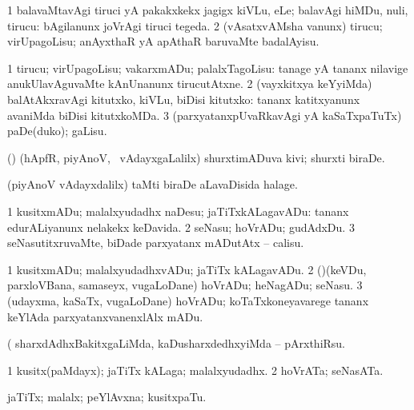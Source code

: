\bentry
{} 
\gl{\sakirx}
\expl{}
\bmng
\bnum
\num{1} balavaMtavAgi tiruci yA pakakxkekx jagigx kiVLu, eLe; balavAgi hiMDu, nuli, tirucu:  bAgilanunx joVrAgi tiruci tegeda. 
\num{2} (vAsatxvAMsha \mo vanunx) tirucu; virUpagoLisu; anAyxthaR yA apAthaR baruvaMte badalAyisu. 
\enum
\emng
\eentry

\bentry
{} 
\gl{\sakirx}
\expl{}
\bmng
\bnum
\num{1} tirucu; virUpagoLisu; vakarxmADu; palalxTagoLisu:  tanage yA tananx nilavige anukUlavAguvaMte kAnUnanunx tirucutAtxne. 
\num{2} (vayxkitxya keYyiMda) balAtAkxravAgi kitutxko, kiVLu, biDisi kitutxko:  tananx katitxyanunx avaniMda biDisi kitutxkoMDa. 
\num{3} (parxyatanxpUvaRkavAgi yA kaSaTxpaTuTx) paDe(duko); gaLisu. 
\enum
\emng
\eentry

\bentry
{} 
\gl{\nA}
\expl{}
\bmng
(\pArxparx) (hApfR, piyAnoV, \mo\ vAdayxgaLalilx) shurxtimADuva kivi; shurxti biraDe. 
\emng
\eentry

\bentry
{} 
\gl{\nA}
\expl{}
\bmng
(piyAnoV vAdayxdalilx) taMti biraDe aLavaDisida halage. 
\emng
\eentry

\bentry 
{} 
\gl{\sakirx}
\expl{}
\bmng
\bnum
\num{1} kusitxmADu; malalxyudadhx naDesu; jaTiTxkALagavADu:  tananx edurALiyanunx nelakekx keDavida. 
\num{2} seNasu; hoVrADu; gudAdxDu. 
\num{3} seNasutitxruvaMte, biDade parxyatanx mADutAtx -- calisu. 
\enum
\emng

\noindent
\gl{\akirx}
\expl{}
\bmng
\bnum
\num{1} kusitxmADu; malalxyudadhxvADu; jaTiTx kALagavADu. 
\num{2} (\rUpa)(keVDu, parxloVBana, samaseyx, \mo vugaLoDane) hoVrADu; heNagADu; seNasu. 
\num{3} (udayxma, kaSaTx, \mo vugaLoDane) hoVrADu; koTaTxkoneyavarege tananx keYlAda parxyatanxvanenxlAlx mADu. 
\enum
\emng

\noindent
\gl{\pagu}
\expl{}
\bmng
{} (  sharxdAdhxBakitxgaLiMda, kaDusharxdedhxyiMda -- pArxthiRsu. 
\emng
\eentry

\bentry 
{} 
\gl{\nA}
\expl{}
\bmng
\bnum
\num{1} kusitx(paMdayx); jaTiTx kALaga; malalxyudadhx. 
\num{2} hoVrATa; seNasATa. 
\enum
\emng
\eentry

\bentry
{} 
\gl{\nA}
\expl{}
\bmng
jaTiTx; malalx; peYlAvxna; kusitxpaTu. 
\emng
\eentry

